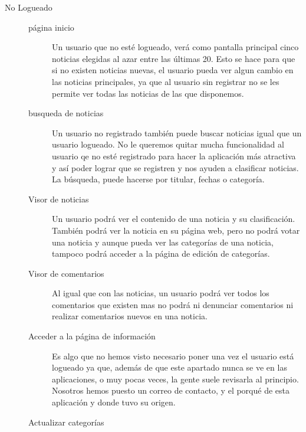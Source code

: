 \begin{description}
\item[No Logueado]
	\begin{description}
		\item[página inicio]
			Un usuario que no esté logueado, verá como pantalla principal cinco noticias elegidas al azar entre las últimas 20. Esto se hace para que si no existen noticias nuevas, el usuario pueda ver algun cambio en las noticias principales, ya que al usuario sin registrar no se les permite ver todas las noticias de las que disponemos.
		\item[busqueda de noticias]
			Un usuario no registrado también puede buscar noticias igual que un usuario logueado. No le queremos quitar mucha funcionalidad al usuario qe no esté registrado para hacer la aplicación más atractiva y así poder lograr que se registren y nos ayuden a clasificar noticias. La búsqueda, puede hacerse por titular, fechas o categoría.
		\item[Visor de noticias]
			Un usuario podrá ver el contenido de una noticia y su clasificación. También podrá ver la noticia en su página web, pero no podrá votar una noticia y aunque pueda ver las categorías de una noticia, tampoco podrá acceder a la página de edición de categorías.
		\item[Visor de comentarios]
			Al igual que con las noticias, un usuario podrá ver todos los comentarios que existen mas no podrá ni denunciar comentarios ni realizar comentarios nuevos en una noticia.
		\item[Acceder a la página de información]
			Es algo que no hemos visto necesario poner una vez el usuario está logueado ya que, además de que este apartado nunca se ve en las aplicaciones, o muy pocas veces, la gente suele revisarla al principio. Nosotros hemos puesto un correo de contacto, y el porqué de esta aplicación y donde tuvo su origen.
		\item[Actualizar categorías]

	\end{description}


\end{description}
